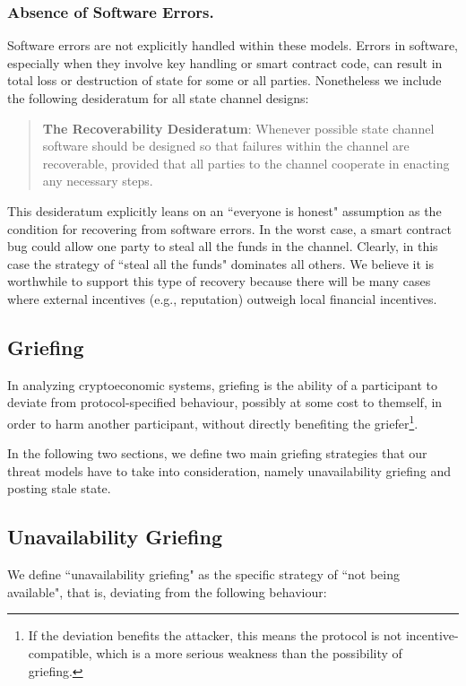 \documentclass[prb,floatfix,reprint,nofootinbib,amsmath,amssymb,epsfig,pre,floats,letterpaper,groupedaffiliation,tightenlines,allcolors=blue,11pt]{revtex4}
\theoremstyle{definition}
\theoremstyle{definition}
\theoremstyle{definition}
\begin{document}
\subsubsection{Absence of Software Errors.} Software errors are not explicitly handled within these models.  Errors in software, especially when they involve key handling or smart contract code, can result in total loss or destruction of state for some or all parties.  Nonetheless we include the following desideratum for all state channel designs:

\begin{quote}
\textbf{The Recoverability Desideratum}: Whenever possible state channel software should be designed so that failures within the channel are recoverable, provided that all parties to the channel cooperate in enacting any necessary steps.
\end{quote}

This desideratum explicitly leans on an ``everyone is honest" assumption as the condition for recovering from software errors. In the worst case, a smart contract bug could allow one party to steal all the funds in the channel. Clearly, in this case the strategy of ``steal all the funds" dominates all others. We believe it is worthwhile to support this type of recovery because there will be many cases where external incentives (e.g., reputation) outweigh local financial incentives.

\subsection{Griefing}

In analyzing cryptoeconomic systems, griefing is the ability of a participant to deviate from protocol-specified behaviour, possibly at some cost to themself, in order to harm another participant, without directly benefiting the griefer\footnote{If the deviation benefits the attacker, this means the protocol is not incentive-compatible, which is a more serious weakness than the possibility of griefing.}.

In the following two sections, we define two main griefing strategies that our threat models have to take into consideration, namely unavailability griefing and posting stale state.

\subsection{Unavailability Griefing}

We define ``unavailability griefing" as the specific strategy of ``not being available", that is, deviating from the following behaviour:
\end{document}
